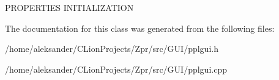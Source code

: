 P\-R\-O\-P\-E\-R\-T\-I\-E\-S I\-N\-I\-T\-I\-A\-L\-I\-Z\-A\-T\-I\-O\-N 

The documentation for this class was generated from the following files\-:\begin{DoxyCompactItemize}
\item 
/home/aleksander/\-C\-Lion\-Projects/\-Zpr/src/\-G\-U\-I/pplgui.\-h\item 
/home/aleksander/\-C\-Lion\-Projects/\-Zpr/src/\-G\-U\-I/pplgui.\-cpp\end{DoxyCompactItemize}
